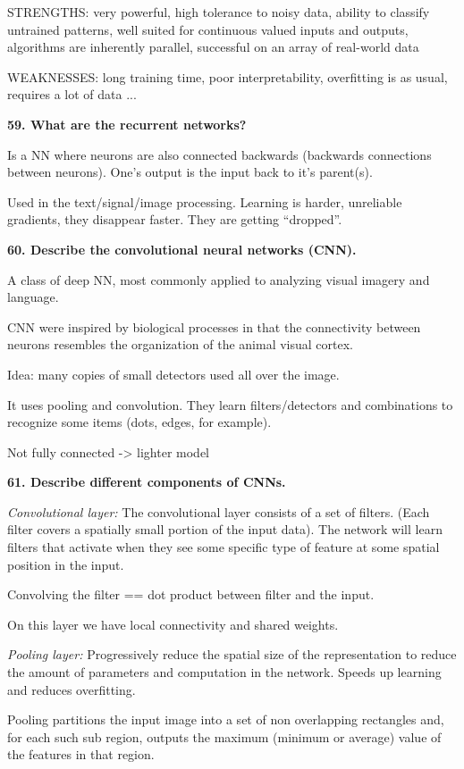 STRENGTHS: very powerful, high tolerance to noisy data, ability to
classify untrained patterns, well suited for continuous valued inputs
and outputs, algorithms are inherently parallel, successful on an array
of real-world data

WEAKNESSES: long training time, poor interpretability, overfitting is as
usual, requires a lot of data ...

\textbf{59. What are the recurrent networks?}

Is a NN where neurons are also connected backwards (backwards
connections between neurons). One's output is the input back to it's
parent(s).

Used in the text/signal/image processing. Learning is harder, unreliable
gradients, they disappear faster. They are getting ``dropped''.

\textbf{60. Describe the convolutional neural networks (CNN).}

A class of deep NN, most commonly applied to analyzing visual imagery
and language.

CNN were inspired by biological processes in that the connectivity
between neurons resembles the organization of the animal visual cortex.

Idea: many copies of small detectors used all over the image.

It uses pooling and convolution. They learn filters/detectors and
combinations to recognize some items (dots, edges, for example).

Not fully connected -\textgreater{} lighter model

\textbf{61. Describe different components of CNNs.}

\textit{Convolutional layer:} The convolutional layer consists of a
set of filters. (Each filter covers a spatially small portion of the
input data). The network will learn filters that activate when they see
some specific type of feature at some spatial position in the input.

Convolving the filter == dot product between filter and the input.

On this layer we have local connectivity and shared weights.

\textit{Pooling layer:} Progressively reduce the spatial size of the
representation to reduce the amount of parameters and computation in the
network. Speeds up learning and reduces overfitting.

Pooling partitions the input image into a set of non overlapping
rectangles and, for each such sub region, outputs the maximum (minimum
or average) value of the features in that region.

